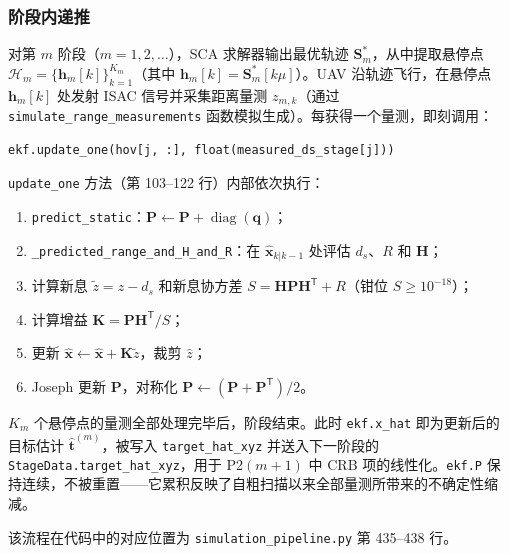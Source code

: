 \subsubsection{阶段内递推}

对第 $m$ 阶段（$m = 1, 2, \ldots$），SCA 求解器输出最优轨迹 $\mathbf{S}_m^*$，从中提取悬停点 $\mathcal{H}_m = \{\mathbf{h}_m[k]\}_{k=1}^{K_m}$（其中 $\mathbf{h}_m[k] = \mathbf{S}_m^*[k\mu]$）。UAV 沿轨迹飞行，在悬停点 $\mathbf{h}_m[k]$ 处发射 ISAC 信号并采集距离量测 $z_{m,k}$（通过 \texttt{simulate\_range\_measurements} 函数模拟生成）。每获得一个量测，即刻调用：

\begin{center}
\begin{minipage}{0.85\textwidth}
\begin{verbatim}
ekf.update_one(hov[j, :], float(measured_ds_stage[j]))
\end{verbatim}
\end{minipage}
\end{center}

\texttt{update\_one} 方法（第 103--122 行）内部依次执行：

\begin{enumerate}
    \item \texttt{predict\_static}：$\mathbf{P} \leftarrow \mathbf{P} + \operatorname{diag}(\mathbf{q})$；
    \item \texttt{\_predicted\_range\_and\_H\_and\_R}：在 $\hat{\mathbf{x}}_{k|k-1}$ 处评估 $d_s$、$R$ 和 $\mathbf{H}$；
    \item 计算新息 $\tilde{z} = z - d_s$ 和新息协方差 $S = \mathbf{H}\mathbf{P}\mathbf{H}^{\mathsf{T}} + R$（钳位 $S \ge 10^{-18}$）；
    \item 计算增益 $\mathbf{K} = \mathbf{P}\mathbf{H}^{\mathsf{T}} / S$；
    \item 更新 $\hat{\mathbf{x}} \leftarrow \hat{\mathbf{x}} + \mathbf{K}\tilde{z}$，裁剪 $\hat{z}$；
    \item Joseph 更新 $\mathbf{P}$，对称化 $\mathbf{P} \leftarrow (\mathbf{P} + \mathbf{P}^{\mathsf{T}})/2$。
\end{enumerate}

$K_m$ 个悬停点的量测全部处理完毕后，阶段结束。此时 \texttt{ekf.x\_hat} 即为更新后的目标估计 $\hat{\mathbf{t}}^{(m)}$，被写入 \texttt{target\_hat\_xyz} 并送入下一阶段的 \texttt{StageData.target\_hat\_xyz}，用于 P2$(m+1)$ 中 CRB 项的线性化。\texttt{ekf.P} 保持连续，不被重置——它累积反映了自粗扫描以来全部量测所带来的不确定性缩减。

该流程在代码中的对应位置为 \texttt{simulation\_pipeline.py} 第 435--438 行。

